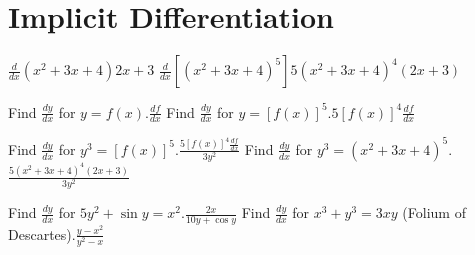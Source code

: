 \section{Implicit Differentiation}

\pairofprobsans%
{$\displaystyle \frac{d}{dx}\left(x^2 + 3x + 4\right)$}{$\displaystyle 2x + 3$}%
{$\displaystyle \frac{d}{dx}\left[\left(x^2 + 3x + 4\right)^5\right]$}{$\displaystyle 5\left(x^2 + 3x + 4\right)^4 \left(2x + 3\right)$}

\pairofprobsans%
{Find $\displaystyle \frac{dy}{dx}$ for $y = f(x)$.}{$\displaystyle \frac{df}{dx}$}%
{Find $\displaystyle \frac{dy}{dx}$ for $y = [f(x)]^5$.}{$\displaystyle 5[f(x)]^4\frac{df}{dx}$}

\newpage
\pairofprobsans%
{Find $\displaystyle \frac{dy}{dx}$ for $y^3 = [f(x)]^5$.}{$\displaystyle \frac{5[f(x)]^4\frac{df}{dx}}{3y^2}$}%
{Find $\displaystyle \frac{dy}{dx}$ for $y^3 = \left(x^2 + 3x + 4\right)^5$.}{$\displaystyle \frac{5\left(x^2 + 3x + 4\right)^4 \left(2x+3\right)}{3y^2}$}

\pairofprobsans%
{Find $\displaystyle \frac{dy}{dx}$ for $5y^2 + \sin{y}= x^2$.}{$\displaystyle \frac{2x}{10y + \cos{y}}$}%
{Find $\displaystyle \frac{dy}{dx}$ for $x^3 + y^3 = 3xy$ (Folium of Descartes).}{$\displaystyle \frac{y - x^2}{y^2 - x}$}

